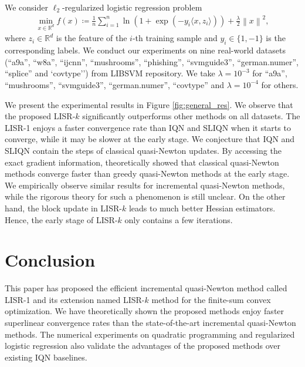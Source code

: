 \documentclass[letterpaper]{article} %
\theoremstyle{plain}
\theoremstyle{definition}
\theoremstyle{remark}
\newcommand\norm[1]{\left\lVert#1\right\rVert}
\def\BR{{\mathbb{R}}}
\begin{document}
We consider $\ell_2$-regularized logistic regression problem 
\begin{equation}
\begin{split}
     \min_{x\in\BR^d} f(x)\!\coloneqq\!\frac{1}{n} \sum_{i=1}^n\ln(1\!+\!\exp(- y_i \langle x, z_i \rangle))\!+\!\frac{\lambda}{2}\!\norm{x}^2\!,
\end{split}
\label{logistic_obj}
\end{equation}
where $z_i\in\BR^d$ is the feature of the $i$-th training sample and $y_i \in \{1,-1\}$ is the corresponding labels.
We conduct our experiments on nine real-world datasets (``a9a'', ``w8a'', ``ijcnn'', ``mushrooms'', ``phishing'', ``svmguide3'', ``german.numer'', ``splice'' and `covtype'') from LIBSVM repository.  
We take $\lambda=10^{-3}$ for ``a9a'', ``mushrooms'', ``svmguide3'', ``german.numer'', ``covtype'' and $\lambda=10^{-4}$ for others.

We present the experimental results in Figure \ref{fig:general_res}.
We observe that the proposed LISR-$k$ significantly outperforms other methods on all datasets. 
The LISR-1 enjoys a faster convergence rate than IQN and SLIQN when it starts to converge, while it may be slower at the early stage. 
We conjecture that IQN and SLIQN contain the steps of classical quasi-Newton updates.
By accessing the exact gradient information, \citet{rodomanov2021new,rodomanov2021rates} theoretically showed that classical quasi-Newton methods converge faster than greedy quasi-Newton methods at the early stage.
We empirically observe similar results for incremental quasi-Newton methods, while the rigorous theory for such a phenomenon is still unclear.
On the other hand, the block update in LISR-$k$ leads to much better Hessian estimators. Hence, the early stage of LISR-$k$ only contains a few iterations.

\section{Conclusion}\label{sec:conclusion}
This paper has proposed the efficient incremental quasi-Newton method called LISR-1 and its extension named LISR-$k$ method for the finite-sum convex optimization. 
We have theoretically shown the proposed methods enjoy faster superlinear convergence rates than the state-of-the-art incremental quasi-Newton methods.
The numerical experiments on quadratic programming and regularized logistic regression also validate the advantages of the proposed methods over existing IQN baselines.
\end{document}
